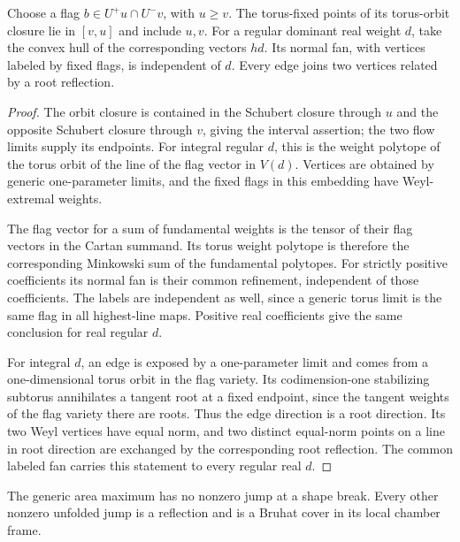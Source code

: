 \begin{lemma}\label{real:polytope}
Choose a flag $b\in U^+u\cap U^-v$, with $u\ge v$.  The torus-fixed
points of its torus-orbit closure lie in $[v,u]$ and include $u,v$.
For a regular dominant real weight $d$, take the convex hull of the
corresponding vectors $hd$.  Its normal fan, with vertices labeled
by fixed flags, is independent of $d$.  Every edge joins two vertices
related by a root reflection.
\end{lemma}

\begin{proof}
The orbit closure is contained in the Schubert closure through $u$
and the opposite Schubert closure through $v$, giving the interval
assertion; the two flow limits supply its endpoints.  For integral
regular $d$, this is the weight polytope of the torus orbit of the
line of the flag vector in $V(d)$.  Vertices are obtained by generic
one-parameter limits, and the fixed flags in this embedding have
Weyl-extremal weights.

The flag vector for a sum of fundamental weights is the tensor of
their flag vectors in the Cartan summand.  Its torus weight polytope
is therefore the corresponding Minkowski sum of the fundamental
polytopes.  For strictly positive coefficients its normal fan is
their common refinement, independent of those coefficients.  The
labels are independent as well, since a generic torus limit is the
same flag in all highest-line maps.  Positive real coefficients give
the same conclusion for real regular $d$.

For integral $d$, an edge is exposed by a one-parameter limit and
comes from a one-dimensional torus orbit in the flag variety.  Its
codimension-one stabilizing subtorus annihilates a tangent root at a
fixed endpoint, since the tangent weights of the flag variety there
are roots.  Thus the edge direction is a root direction.  Its two
Weyl vertices have equal norm, and two distinct equal-norm points on
a line in root direction are exchanged by the corresponding root
reflection.  The common labeled fan carries this statement to every
regular real $d$.
\end{proof}

\begin{lemma}\label{real:covers}
The generic area maximum has no nonzero jump at a shape break.
Every other nonzero unfolded jump is a reflection and is a Bruhat
cover in its local chamber frame.
\end{lemma}

